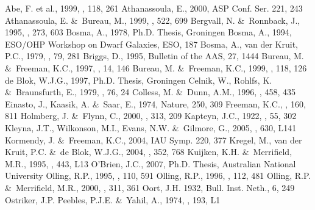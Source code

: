 \documentclass[traditabstract]{aa} %
\begin{document}
%
\begin{thebibliography}{}
Abe, F. et al., 1999, \aj, 118, 261
Athanassoula, E., 2000, ASP Conf. Ser. 221, 243
Athanassoula, E. \&\ Bureau, M., 1999, \apj, 522, 699
Bergvall, N. \&\ Ronnback, J., 1995, \mnras, 273, 603
Bosma, A., 1978, Ph.D. Thesis, Groningen
Bosma, A., 1994, ESO/OHP Workshop on Dwarf Galaxies, ESO, 187
Bosma, A., van der Kruit, P.C., 1979, \aap, 79, 281
Briggs, D., 1995, Bulletin of the AAS, 27, 1444
Bureau, M. \&\ Freeman, K.C., 1997, \pasa, 14, 146
Bureau, M. \&\ Freeman, K.C., 1999, \aj, 118, 126
de Blok, W.J.G., 1997, Ph.D. Thesis, Groningen
Celnik, W., Rohlfs, K. \&\ Braunsfurth, E., 1979, \aap, 76, 24
Colless, M. \&\  Dunn, A.M., 1996, \apj, 458, 435
Einasto, J., Kaasik, A. \&\ Saar, E., 1974, Nature, 250, 309
Freeman, K.C., \apj, 160, 811
Holmberg, J. \&\ Flynn, C., 2000, \mnras, 313, 209
Kapteyn, J.C., 1922, \apj, 55, 302
Kleyna, J.T., Wilkonson, M.I., Evans, N.W. \&\ Gilmore, G., 2005, 
\apj, 630, L141
Kormendy, J. \&\ Freeman, K.C., 2004, IAU Symp. 220, 377
Kregel, M., van der Kruit, P.C. \&\ de Blok, W.J.G., 2004, \mnras, 352, 768
Kuijken, K.H. \&\ Merrifield, M.R., 1995, \apj, 443, L13
O'Brien, J.C., 2007, Ph.D. Thesis, Australian National University
Olling, R.P., 1995, \aj, 110, 591
Olling, R.P., 1996, \aj, 112, 481
Olling, R.P. \&\ Merrifield, M.R., 2000, \mnras, 311, 361
Oort, J.H. 1932, Bull. Inst. Neth., 6, 249
Ostriker, J.P. Peebles, P.J.E. \&\ Yahil, A., 1974, \apj, 193, L1

\end{thebibliography}
\end{document}
